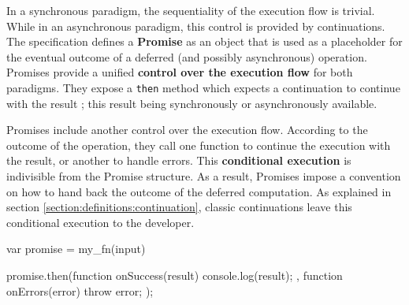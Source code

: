 
In a synchronous paradigm, the sequentiality of the execution flow is trivial.
While in an asynchronous paradigm, this control is provided by continuations.
The specification defines a \textbf{Promise} as an object that is used as a placeholder for the eventual outcome of a deferred (and possibly asynchronous) operation.
Promises provide a unified \textbf{control over the execution flow} for both paradigms.
They expose a \texttt{then} method which expects a continuation to continue with the result ; this result being synchronously or asynchronously available.


Promises include another control over the execution flow.
According to the outcome of the operation, they call one function to continue the execution with the result, or another to handle errors.
This \textbf{conditional execution} is indivisible from the Promise structure.
As a result, Promises impose a convention on how to hand back the outcome of the deferred computation.
As explained in section \ref{section:definitions:continuation}, classic continuations leave this conditional execution to the developer.

\begin{code}[js, %
             caption={Example of a promise}, %
             label={lst:then}] %
var promise = my_fn(input)

promise.then(function onSuccess(result) {
  console.log(result);
}, function onErrors(error) {
  throw error;
});
\end{code}


